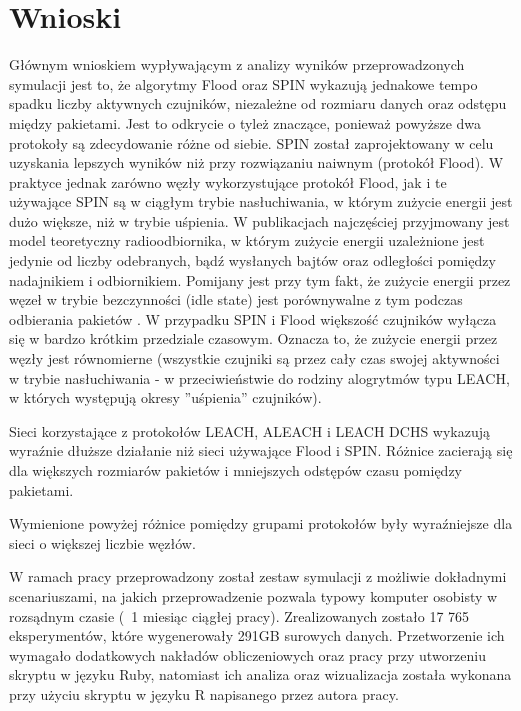 \chapter{Wnioski}
Głównym wnioskiem wypływającym z analizy wyników przeprowadzonych symulacji jest to, że algorytmy Flood oraz SPIN wykazują jednakowe tempo spadku liczby aktywnych czujników, niezależne od rozmiaru danych oraz odstępu między pakietami. Jest to odkrycie o tyleż znaczące, ponieważ powyższe dwa protokoły są zdecydowanie różne od siebie. SPIN został zaprojektowany w celu uzyskania lepszych wyników niż przy rozwiązaniu naiwnym (protokół Flood). W praktyce jednak zarówno węzły wykorzystujące protokół Flood, jak i te używające SPIN są w ciągłym trybie nasłuchiwania, w którym zużycie energii jest dużo większe, niż w trybie uśpienia. W publikacjach najczęściej przyjmowany jest model teoretyczny radioodbiornika, w którym zużycie energii uzależnione jest jedynie od liczby odebranych, bądź wysłanych bajtów oraz odległości pomiędzy nadajnikiem i odbiornikiem. Pomijany jest przy tym fakt, że zużycie energii przez węzeł w trybie bezczynności (idle state) jest porównywalne z tym podczas odbierania pakietów \cite{Odey2013}.
W przypadku SPIN i Flood większość czujników wyłącza się w bardzo krótkim przedziale czasowym. Oznacza to, że zużycie energii przez węzły jest równomierne (wszystkie czujniki są przez cały czas swojej aktywności w trybie nasłuchiwania - w przeciwieństwie do rodziny alogrytmów typu LEACH, w których występują okresy ''uśpienia'' czujników).

Sieci korzystające z protokołów LEACH, ALEACH i LEACH DCHS wykazują wyraźnie dłuższe działanie niż sieci używające Flood i SPIN.
Różnice zacierają się dla większych rozmiarów pakietów i mniejszych odstępów czasu pomiędzy pakietami.

Wymienione powyżej różnice pomiędzy grupami protokołów były wyraźniejsze dla sieci o większej liczbie węzłów.

W ramach pracy przeprowadzony został zestaw symulacji z możliwie dokładnymi scenariuszami, na jakich przeprowadzenie pozwala typowy komputer osobisty w rozsądnym czasie (~1 miesiąc ciągłej pracy). Zrealizowanych zostało 17 765 eksperymentów, które wygenerowały 291GB surowych danych. Przetworzenie ich wymagało dodatkowych nakładów obliczeniowych oraz pracy przy utworzeniu skryptu w języku Ruby, natomiast ich analiza oraz wizualizacja została wykonana przy użyciu skryptu w języku R napisanego przez autora pracy.


